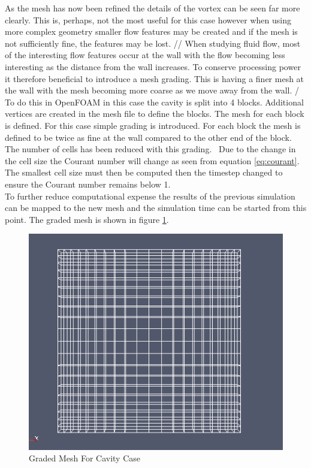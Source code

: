 \documentclass[]{report}
\begin{document}
As the mesh has now been refined the details of the vortex can be seen far more clearly. This is, perhaps, not the most useful for this case however when using more complex geometry smaller flow features may be created and if the mesh is not sufficiently fine, the features may be lost. 
//
When studying fluid flow, most of the interesting flow features occur at the wall with the flow becoming less interesting as the distance from the wall increases. To conserve processing power it therefore beneficial to introduce a mesh grading. This is having a finer mesh at the wall with the mesh becoming more coarse as we move away from the wall. 
/
To do this in OpenFOAM in this case the cavity is split into 4 blocks. Additional vertices are created in the mesh file to define the blocks. The mesh for each block is defined. For this case simple grading is introduced. For each block the mesh is defined to be twice as fine at the wall compared to the other end of the block. The number of cells has been reduced with this grading.
\
Due to the change in the cell size the Courant number will change as seen from equation \ref{eq:courant}. The smallest cell size must then be computed then the timestep changed to ensure the Courant number remains below 1. 
\\
To further reduce computational expense the results of the previous simulation can be mapped to the new mesh and the simulation time can be started from this point. The graded mesh is shown in figure \ref{fig:cavity_graded}.  

\begin{figure}[h]
	\centering
	\includegraphics[scale=0.5]{Graded_mesh.png}
	\caption{Graded Mesh For Cavity Case}
	\label{fig:cavity_graded}
\end{figure}
\end{document}
